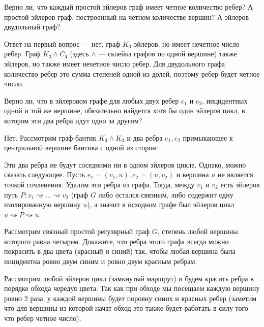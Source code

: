 \documentclass[a4paper,12pt,twoside]{article}
\begin{document}
\begin{?}
    Верно ли, что каждый простой эйлеров граф имеет четное количество ребер? А простой эйлеров граф, построенный на четном количестве вершин? А эйлеров двудольный граф?
\end{?}
\begin{solution}{}
    Ответ на первый вопрос --- нет, граф \(K_3\) эйлеров, но имеет нечетное число ребер. Граф \(K_3 \wedge C_4\) (здесь \(\wedge\) --- склейка графов по одной вершине) также эйлеров, но также имеет нечетное число ребер. Для двудольного графа количество ребер это сумма степеней одной из долей, поэтому ребер будет четное число.
\end{solution}
\begin{?}
    Верно ли, что в эйлеровом графе для любых двух ребер $e_1$ и $e_2$, инцидентных одной и той же вершине, обязательно найдется хотя бы один эйлеров цикл, в котором эти два ребра идут одно за другим?
\end{?}
\begin{solution}{}
    Нет. Рассмотрим граф-бантик \(K_3 \wedge K_3\) и два ребра \(e_1, e_2\) примыкающее к центральной вершине бантика с одной из сторон:
    \begin{center}
    \end{center}
    Эти два ребра не будут соседними ни в одном эйлеров цикле. Однако, можно сказать следующее. Пусть \(e_1 = (v_1, u), e_2 = (u, v_2)\) и вершина \(u\) не является точкой сочленения. Удалим эти ребра из графа. Тогда, между \(v_1\) и \(v_2\) есть эйлеров путь \(P \colon v_1 \rightsquigarrow \ldots \rightsquigarrow v_2\) (граф \(G\) либо остался связным, либо содержит одну изолированную вершину \(u\)), а значит в исходном графе был эйлеров цикл \(u \rightsquigarrow P \rightsquigarrow u\).
\end{solution}
\begin{?}
    Рассмотрим связный простой регулярный граф $G$, степень любой вершины которого равна четырем. Докажите, что ребра этого графа всегда можно покрасить в два цвета (красный и синий) так, чтобы любая вершина была инцидентна ровно двум синим и ровно двум красным ребрам.
\end{?}
\begin{solution}{}
    Рассмотрим любой эйлеров цикл (замкнутый маршрут) и будем красить ребра в порядке обхода чередуя цвета. Так как при обходе мы посещаем каждую вершину ровно 2 раза, у каждой вершины будет поровну синих и красных ребер (заметим что для вершины из которой начат обход это также будет работать в силу того что ребер четное число). 
\end{solution}
\end{document}
